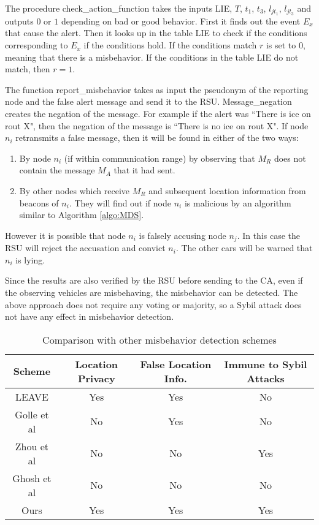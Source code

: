 \documentclass[conference]{IEEEtran}[10pt]
\begin{document}
The procedure check\_action\_function takes the inputs LIE, $T$, $t_1$, $t_3$, $l_{jt_1}$, $l_{jt_3}$ and outputs
$0$ or $1$ depending on bad or good behavior. 
First it finds out the event $E_x$ that cause the alert. 
Then it looks up in the table LIE to check if the conditions corresponding to $E_x$ if the conditions hold. 
If the conditions match $r$ is set to 0, meaning that there is a misbehavior. 
If the conditions in the table LIE do not match, then $r =1$. 

The function report\_misbehavior takes as input the pseudonym of the reporting node and the false alert message and send it to the RSU. 
Message\_negation creates the negation of the message. 
For example if the alert was ``There is ice on rout X", then the negation of the message is 
``There is no ice on rout X". 
If node $n_i$ retransmits a false message, then it will be found in either of the two ways: 
\begin{enumerate}
\item By node $n_i$ (if within communication range) by
observing that $M_R$ does not contain the message $M_A$ that it had sent. 
\item By other nodes which receive $M_R$ and subsequent location information from beacons of $n_i$.
They will find out if node $n_i$ is malicious by an algorithm similar to Algorithm \ref{algo:MDS}. 
\end{enumerate}

However it is possible that node $n_i$ is falsely accusing node $n_j$. 
In this case the RSU will reject the accusation and convict $n_i$. 
The other cars will be warned that $n_i$ is lying. 

Since the results are also verified by the RSU before sending to the CA, even if the observing vehicles are misbehaving, the 
misbehavior can be detected. 
The above approach does not require any voting or majority, so a Sybil attack does not have any effect in 
misbehavior detection. 

\begin{table*}
\begin{center}
{\normalsize
\begin{tabular}{|c|c|c|c|}
\hline
Scheme & Location Privacy & False Location Info. & Immune to Sybil Attacks\\
\hline
LEAVE \cite{RPAJH07} & Yes & Yes & No \\
Golle et al \cite{GGS04} & No & Yes & No\\
Zhou et al \cite{ZCNC07} & No & No & Yes\\
Ghosh et al \cite{GVGKM10} & No & No & No \\
Ours & Yes & Yes & Yes\\
\hline
\end{tabular}
}
\end{center}
\caption{Comparison with other misbehavior detection schemes}
\label{table:other_MDS}
\end{table*}
\end{document}

